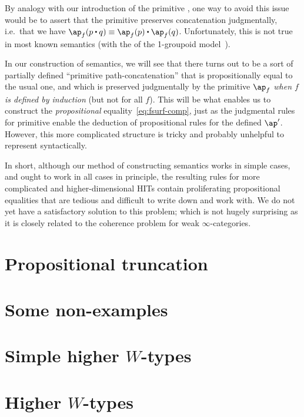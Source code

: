 \documentclass{amsart}
\begin{document}
By analogy with our introduction of the primitive \fap, one way to avoid this issue would be to assert that the primitive \fap preserves concatenation judgmentally, i.e.\ that we have $\ap_{f}(p\ct q) \jdeq \ap_{f}(p) \ct \ap_{f}(q)$.
Unfortunately, this is not true in most known semantics (with the  of the 1-groupoid model~\cite{hs:gpd-typethy}).

In our construction of semantics, we will see that there turns out to be a sort of partially defined ``primitive path-concatenation'' that is propositionally equal to the usual one, and which is preserved judgmentally by the primitive $\ap_{f}$ \emph{when $f$ is defined by induction} (but not for all $f$).
This will be what enables us to construct the \emph{propositional} equality~\eqref{eq:fsurf-comp}, just as the judgmental rules for primitive \fap enable the deduction of propositional rules for the defined $\ap'$.
However, this more complicated structure is tricky and probably unhelpful to represent syntactically.

In short, although our method of constructing semantics works in simple cases, and ought to work in all cases in principle, the resulting rules for more complicated and higher-dimensional HITs contain proliferating propositional equalities that are tedious and difficult to write down and work with.
We do not yet have a satisfactory solution to this problem; which is not hugely surprising as it is closely related to the coherence problem for weak $\infty$-categories.


\section{Propositional truncation}
\label{sec:brck}


\section{Some non-examples}
\label{sec:loopy}


\section{Simple higher $W$-types}
\label{sec:twoconstr-hwt}


\section{Higher $W$-types}
\label{sec:hwt}




\end{document}
